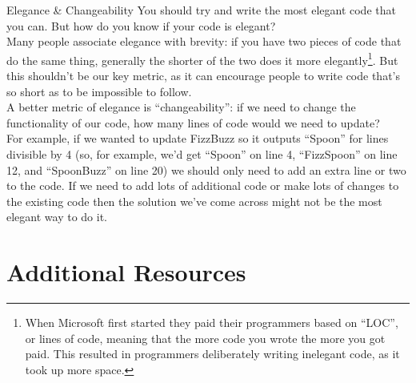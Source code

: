 \begin{infobox}{Elegance \& Changeability}
    You should try and write the most elegant code that you can. But how do you know if your code is elegant?
    \\

    Many people associate elegance with brevity: if you have two pieces of code that do the same thing, generally the shorter of the two does it more elegantly\footnote{When Microsoft first started they paid their programmers based on ``LOC'', or lines of code, meaning that the more code you wrote the more you got paid. This resulted in programmers deliberately writing inelegant code, as it took up more space.}. But this shouldn't be our key metric, as it can encourage people to write code that's so short as to be impossible to follow.
    \\

    A better metric of elegance is ``changeability'': if we need to change the functionality of our code, how many lines of code would we need to update?
    \\

    For example, if we wanted to update FizzBuzz so it outputs ``Spoon'' for lines divisible by 4 (so, for example, we'd get ``Spoon'' on line 4, ``FizzSpoon'' on line 12, and ``SpoonBuzz'' on line 20) we should only need to add an extra line or two to the code. If we need to add lots of additional code or make lots of changes to the existing code then the solution we've come across might not be the most elegant way to do it.

\end{infobox}

\pagebreak

\section{Additional Resources}

